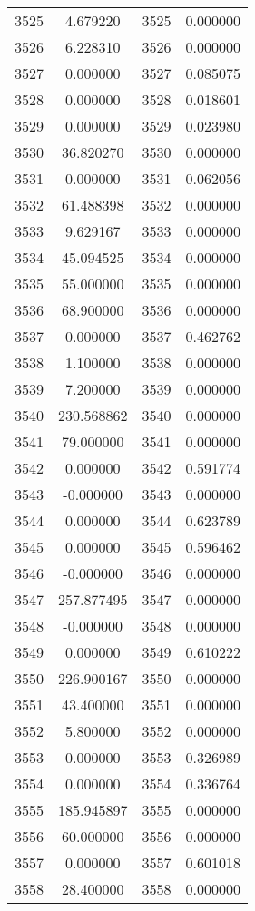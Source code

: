 \documentclass[12pt]{article}
\begin{document}
\begin{longtable}{@{}cccc@{}}
3525 & 4.679220 & 3525 & 0.000000 \\
3526 & 6.228310 & 3526 & 0.000000 \\
3527 & 0.000000 & 3527 & 0.085075 \\
3528 & 0.000000 & 3528 & 0.018601 \\
3529 & 0.000000 & 3529 & 0.023980 \\
3530 & 36.820270 & 3530 & 0.000000 \\
3531 & 0.000000 & 3531 & 0.062056 \\
3532 & 61.488398 & 3532 & 0.000000 \\
3533 & 9.629167 & 3533 & 0.000000 \\
3534 & 45.094525 & 3534 & 0.000000 \\
3535 & 55.000000 & 3535 & 0.000000 \\
3536 & 68.900000 & 3536 & 0.000000 \\
3537 & 0.000000 & 3537 & 0.462762 \\
3538 & 1.100000 & 3538 & 0.000000 \\
3539 & 7.200000 & 3539 & 0.000000 \\
3540 & 230.568862 & 3540 & 0.000000 \\
3541 & 79.000000 & 3541 & 0.000000 \\
3542 & 0.000000 & 3542 & 0.591774 \\
3543 & -0.000000 & 3543 & 0.000000 \\
3544 & 0.000000 & 3544 & 0.623789 \\
3545 & 0.000000 & 3545 & 0.596462 \\
3546 & -0.000000 & 3546 & 0.000000 \\
3547 & 257.877495 & 3547 & 0.000000 \\
3548 & -0.000000 & 3548 & 0.000000 \\
3549 & 0.000000 & 3549 & 0.610222 \\
3550 & 226.900167 & 3550 & 0.000000 \\
3551 & 43.400000 & 3551 & 0.000000 \\
3552 & 5.800000 & 3552 & 0.000000 \\
3553 & 0.000000 & 3553 & 0.326989 \\
3554 & 0.000000 & 3554 & 0.336764 \\
3555 & 185.945897 & 3555 & 0.000000 \\
3556 & 60.000000 & 3556 & 0.000000 \\
3557 & 0.000000 & 3557 & 0.601018 \\
3558 & 28.400000 & 3558 & 0.000000 \\

\end{longtable}
\end{document}
